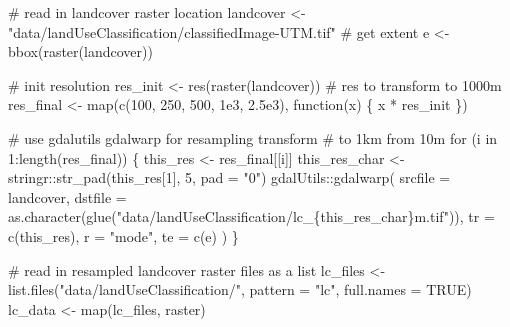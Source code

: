 \documentclass[]{article}
\newenvironment{Shaded}{}{}
\newcommand{\CommentTok}[1]{\textcolor[rgb]{0.00,0.50,0.00}{#1}}
\newcommand{\ControlFlowTok}[1]{\textcolor[rgb]{0.00,0.00,1.00}{#1}}
\newcommand{\DataTypeTok}[1]{#1}
\newcommand{\DecValTok}[1]{#1}
\newcommand{\FloatTok}[1]{#1}
\newcommand{\KeywordTok}[1]{\textcolor[rgb]{0.00,0.00,1.00}{#1}}
\newcommand{\NormalTok}[1]{#1}
\newcommand{\OperatorTok}[1]{#1}
\newcommand{\OtherTok}[1]{\textcolor[rgb]{1.00,0.25,0.00}{#1}}
\newcommand{\StringTok}[1]{\textcolor[rgb]{0.00,0.50,0.50}{#1}}
\begin{document}
\begin{Shaded}
\begin{Highlighting}[numbers=left,,]
\CommentTok{# read in landcover raster location}
\NormalTok{landcover <-}\StringTok{ "data/landUseClassification/classifiedImage-UTM.tif"}
\CommentTok{# get extent}
\NormalTok{e <-}\StringTok{ }\KeywordTok{bbox}\NormalTok{(}\KeywordTok{raster}\NormalTok{(landcover))}

\CommentTok{# init resolution}
\NormalTok{res_init <-}\StringTok{ }\KeywordTok{res}\NormalTok{(}\KeywordTok{raster}\NormalTok{(landcover))}
\CommentTok{# res to transform to 1000m}
\NormalTok{res_final <-}\StringTok{ }\KeywordTok{map}\NormalTok{(}\KeywordTok{c}\NormalTok{(}\DecValTok{100}\NormalTok{, }\DecValTok{250}\NormalTok{, }\DecValTok{500}\NormalTok{, }\FloatTok{1e3}\NormalTok{, }\FloatTok{2.5e3}\NormalTok{), }\ControlFlowTok{function}\NormalTok{(x) \{}
\NormalTok{  x }\OperatorTok{*}\StringTok{ }\NormalTok{res_init}
\NormalTok{\})}

\CommentTok{# use gdalutils gdalwarp for resampling transform}
\CommentTok{# to 1km from 10m}
\ControlFlowTok{for}\NormalTok{ (i }\ControlFlowTok{in} \DecValTok{1}\OperatorTok{:}\KeywordTok{length}\NormalTok{(res_final)) \{}
\NormalTok{  this_res <-}\StringTok{ }\NormalTok{res_final[[i]]}
\NormalTok{  this_res_char <-}\StringTok{ }\NormalTok{stringr}\OperatorTok{::}\KeywordTok{str_pad}\NormalTok{(this_res[}\DecValTok{1}\NormalTok{], }\DecValTok{5}\NormalTok{, }\DataTypeTok{pad =} \StringTok{"0"}\NormalTok{)}
\NormalTok{  gdalUtils}\OperatorTok{::}\KeywordTok{gdalwarp}\NormalTok{(}
    \DataTypeTok{srcfile =}\NormalTok{ landcover,}
    \DataTypeTok{dstfile =} \KeywordTok{as.character}\NormalTok{(}\KeywordTok{glue}\NormalTok{(}\StringTok{"data/landUseClassification/lc_\{this_res_char\}m.tif"}\NormalTok{)),}
    \DataTypeTok{tr =} \KeywordTok{c}\NormalTok{(this_res), }\DataTypeTok{r =} \StringTok{"mode"}\NormalTok{, }\DataTypeTok{te =} \KeywordTok{c}\NormalTok{(e)}
\NormalTok{  )}
\NormalTok{\}}
\end{Highlighting}
\end{Shaded}

\begin{Shaded}
\begin{Highlighting}[numbers=left,,]
\CommentTok{# read in resampled landcover raster files as a list}
\NormalTok{lc_files <-}\StringTok{ }\KeywordTok{list.files}\NormalTok{(}\StringTok{"data/landUseClassification/"}\NormalTok{, }\DataTypeTok{pattern =} \StringTok{"lc"}\NormalTok{, }\DataTypeTok{full.names =} \OtherTok{TRUE}\NormalTok{)}
\NormalTok{lc_data <-}\StringTok{ }\KeywordTok{map}\NormalTok{(lc_files, raster)}
\end{Highlighting}
\end{Shaded}
\end{document}
